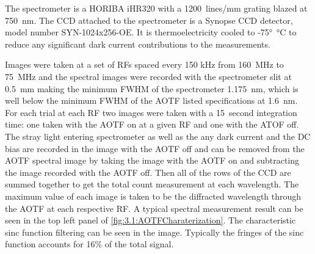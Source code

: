 The spectrometer is a HORIBA iHR320 with a 1200~lines/mm grating blazed at 750~nm. The CCD attached to the spectrometer is a Synopse CCD detector, model number SYN-1024x256-OE. It is thermoelectricity cooled to -75\si{\degree\celsius} to reduce any significant dark current contributions to the measurements.

Images were taken at a set of RFs spaced every 150 kHz from 160~MHz to 75~MHz and the spectral images were recorded with the spectrometer slit at 0.5~mm making the minimum FWHM of the spectrometer 1.175~nm, which is well below the minimum FWHM of the AOTF listed specifications at 1.6~nm. For each trial at each RF two images were taken with a 15~second integration time: one taken with the AOTF on at a given RF and one with the ATOF off. The stray light entering spectrometer as well as the any dark current and the DC bias are recorded in the image with the AOTF off and can be removed from the AOTF spectral image by taking the image with the AOTF on and subtracting the image recorded with the AOTF off. Then all of the rows of the CCD are summed together to get the total count measurement at each wavelength. The maximum value of each image is taken to be the diffracted wavelength through the AOTF at each respective RF. A typical spectral measurement result can be seen in the top left panel of \autoref{fig:3.1:AOTFCharaterization}. The characteristic sinc function filtering can be seen in the image. Typically the fringes of the sinc function accounts for 16\% of the total signal.

